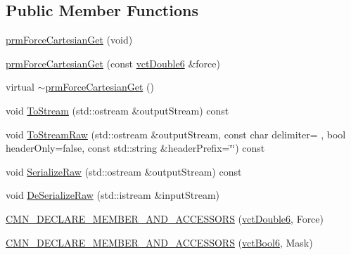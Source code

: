 \subsection*{Public Member Functions}
\begin{DoxyCompactItemize}
\item 
\hyperlink{classprm_force_cartesian_get_aacad506567376093d49ebbd69bea5355}{prm\+Force\+Cartesian\+Get} (void)
\item 
\hyperlink{classprm_force_cartesian_get_a7af1dd7ef1ca587cb037102444dc095a}{prm\+Force\+Cartesian\+Get} (const \hyperlink{vct_fixed_size_vector_types_8h_a26a80e4d58f1201f2bfc347f4ac81bf8}{vct\+Double6} \&force)
\item 
virtual \hyperlink{classprm_force_cartesian_get_a38fd5313a66389faeb4535047eff9019}{$\sim$prm\+Force\+Cartesian\+Get} ()
\item 
void \hyperlink{classprm_force_cartesian_get_a45111d87d2472c075f4221f8c03cc3b2}{To\+Stream} (std\+::ostream \&output\+Stream) const 
\item 
void \hyperlink{classprm_force_cartesian_get_ab632a651988b5cdb45b04e386ca29f45}{To\+Stream\+Raw} (std\+::ostream \&output\+Stream, const char delimiter= \textquotesingle{} \textquotesingle{}, bool header\+Only=false, const std\+::string \&header\+Prefix=\char`\"{}\char`\"{}) const 
\item 
void \hyperlink{classprm_force_cartesian_get_ae1f8dacae06b9c238101f74f789f756a}{Serialize\+Raw} (std\+::ostream \&output\+Stream) const 
\item 
void \hyperlink{classprm_force_cartesian_get_aef7c5f93323985c0c0b3af747c8701ae}{De\+Serialize\+Raw} (std\+::istream \&input\+Stream)
\end{DoxyCompactItemize}
{\bf }\par
\begin{DoxyCompactItemize}
\item 
\hyperlink{classprm_force_cartesian_get_a50ce36300f062d77fa72f04b979e1737}{C\+M\+N\+\_\+\+D\+E\+C\+L\+A\+R\+E\+\_\+\+M\+E\+M\+B\+E\+R\+\_\+\+A\+N\+D\+\_\+\+A\+C\+C\+E\+S\+S\+O\+R\+S} (\hyperlink{vct_fixed_size_vector_types_8h_a26a80e4d58f1201f2bfc347f4ac81bf8}{vct\+Double6}, Force)
\end{DoxyCompactItemize}

{\bf }\par
\begin{DoxyCompactItemize}
\item 
\hyperlink{classprm_force_cartesian_get_adfad42e7974284d2c14461784a9d1151}{C\+M\+N\+\_\+\+D\+E\+C\+L\+A\+R\+E\+\_\+\+M\+E\+M\+B\+E\+R\+\_\+\+A\+N\+D\+\_\+\+A\+C\+C\+E\+S\+S\+O\+R\+S} (\hyperlink{vct_fixed_size_vector_types_8h_a1494a41869ce763813f2bf7f922b8fdd}{vct\+Bool6}, Mask)
\end{DoxyCompactItemize}



